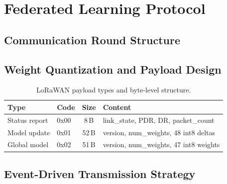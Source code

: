 \section{Federated Learning Protocol}
\label{sec:fl-protocol}

\subsection{Communication Round Structure}

\subsection{Weight Quantization and Payload Design}

\begin{table}[H]
  \centering
  \caption{LoRaWAN payload types and byte-level structure.}
  \label{tab:payloads}
  \begin{tabular}{llcp{5cm}}
    \toprule
    \textbf{Type} & \textbf{Code} & \textbf{Size} & \textbf{Content} \\
    \midrule
    Status report   & 0x00 & 8\,B  & link\_state, PDR, DR, packet\_count \\
    Model update    & 0x01 & 52\,B & version, num\_weights, 48 int8 deltas \\
    Global model    & 0x02 & 51\,B & version, num\_weights, 47 int8 weights \\
    \bottomrule
  \end{tabular}
\end{table}


\subsection{Event-Driven Transmission Strategy}

